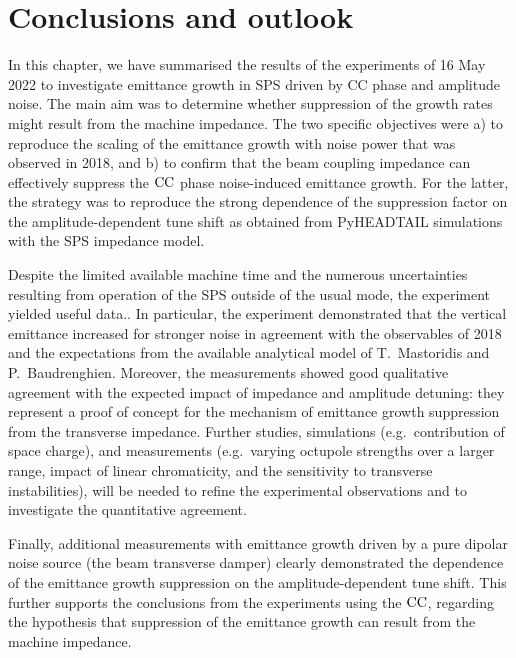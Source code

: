 \section{Conclusions and outlook}\label{sec:Ch8_conclusions}
In this chapter, we have summarised the results of the experiments of 16 May 2022 to investigate emittance growth in SPS driven by CC phase and amplitude noise.  The main aim was to determine whether suppression of the growth rates might result from the machine impedance. The two specific objectives were a) to reproduce the scaling of the emittance growth with noise power that was observed in 2018, and b) to confirm that the beam coupling impedance can effectively suppress the ${\mathrm{CC}}$ phase noise-induced emittance growth. For the latter, the strategy was to reproduce the strong dependence of the suppression factor on the amplitude-dependent tune shift as obtained from PyHEADTAIL simulations with the SPS impedance model.

Despite the limited available machine time and the numerous uncertainties resulting from operation of the SPS outside of the usual mode, the experiment yielded useful data.. In particular, the experiment demonstrated that the vertical emittance increased for stronger noise in agreement with the observables of 2018 and the expectations from the available analytical model of T.~Mastoridis and P.~Baudrenghien. Moreover, the measurements showed good qualitative agreement with the expected impact of impedance and amplitude detuning: they represent a proof of concept for the mechanism of emittance growth suppression from the transverse impedance. Further studies, simulations (e.g.~contribution of space charge), and measurements (e.g.~varying octupole strengths over a larger range, impact of linear chromaticity, and the sensitivity to transverse instabilities), will be needed to refine the experimental observations and to investigate the quantitative agreement. 

Finally, additional measurements with emittance growth driven by a pure dipolar noise source (the beam transverse damper) clearly demonstrated the dependence of the emittance growth suppression on the amplitude-dependent tune shift.  This further supports the conclusions from the experiments using the ${\mathrm{CC}}$, regarding the hypothesis that suppression of the emittance growth can result from the machine impedance.

